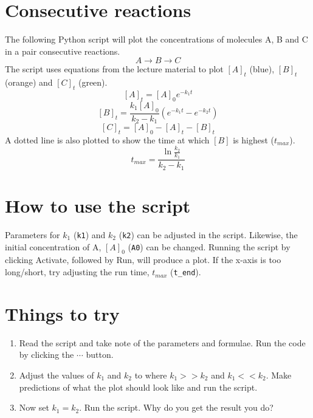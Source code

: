 \documentclass{article}
\begin{document}
\section{Consecutive reactions}

The following Python script will plot the concentrations of molecules A, B and C in a pair consecutive reactions.
$$A\longrightarrow B\longrightarrow C$$
The script uses equations from the lecture material to plot $[A]_t$ (blue), $[B]_t$ (orange) and $[C]_t$ (green).
\[[A]_t = [A]_0e^{-k_1t}\]
\[[B]_t = \frac{k_1[A]_0}{k_2-k_1}(e^{-k_1t}-e^{-k_2t})\]
\[[C]_t = [A]_0-[A]_t-[B]_t\]
A dotted line is also plotted to show the time at which $[B]$ is highest ($t_{max}$).
\[t_{max} = \frac{\ln \frac{k_2}{k_1}}{k_2-k_1}\]

\section{How to use the script}
Parameters for $k_1$ (\texttt{k1}) and $k_2$ (\texttt{k2}) can be adjusted in the script. Likewise, the initial concentration of A, $[A]_0$ (\texttt{A0}) can be changed. Running the script by clicking Activate, followed by Run, will produce a plot. If the x-axis is too long/short, try adjusting the run time, $t_{max}$ (\texttt{t\_end}).

\section{Things to try}
\begin{enumerate}
\item Read the script and take note of the parameters and formulae. Run the code by clicking the $\cdots$ button.
\item Adjust the values of $k_1$ and $k_2$ to where $k_1>>k_2$ and $k_1<<k_2$. Make predictions of what the plot should look like and run the script.
\item Now set $k_1=k_2$. Run the script. Why do you get the result you do?
\end{enumerate}
\end{document}
